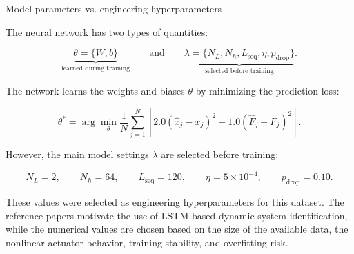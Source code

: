 \documentclass[11pt]{article}
\begin{document}
\begin{summarybox}{Model parameters vs. engineering hyperparameters}

The neural network has two types of quantities:

\[
\underbrace{\theta=\{W,b\}}_{\text{learned during training}}
\qquad\text{and}\qquad
\underbrace{\lambda=\{N_L,N_h,L_{\mathrm{seq}},\eta,p_{\mathrm{drop}}\}}_{\text{selected before training}}.
\]

The network learns the weights and biases $\theta$ by minimizing the prediction loss:

\[
\theta^{*}
=
\arg\min_{\theta}
\frac{1}{N}
\sum_{j=1}^{N}
\left[
2.0(\hat{x}_j-x_j)^2
+
1.0(\hat{F}_j-F_j)^2
\right].
\]

However, the main model settings $\lambda$ are selected before training:

\[
N_L=2,\qquad
N_h=64,\qquad
L_{\mathrm{seq}}=120,\qquad
\eta=5\times10^{-4},\qquad
p_{\mathrm{drop}}=0.10.
\]

These values were selected as engineering hyperparameters for this dataset. The reference papers motivate the use of LSTM-based dynamic system identification, while the numerical values are chosen based on the size of the available data, the nonlinear actuator behavior, training stability, and overfitting risk.
\end{summarybox}
\end{document}
